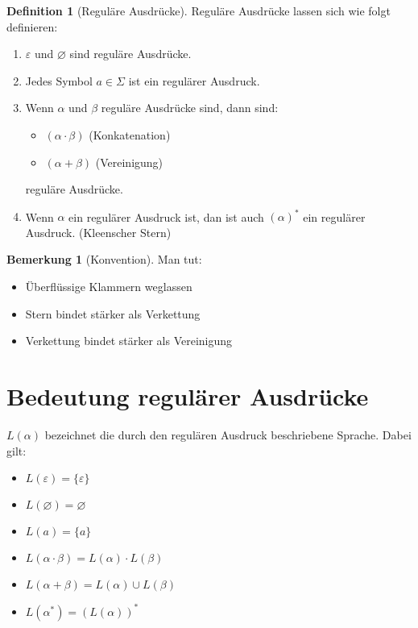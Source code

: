 \documentclass[11pt]{article} %
\theoremstyle{definition}
\newtheorem{definition}{Definition}
\newtheorem*{bemerkung}{Bemerkung}
\begin{document}
\begin{definition}[Reguläre Ausdrücke]
Reguläre Ausdrücke lassen sich wie folgt definieren:
\begin{enumerate}
\item $\varepsilon$ und $\varnothing$ sind reguläre Ausdrücke.
\item Jedes Symbol $a \in \Sigma$ ist ein regulärer Ausdruck.
\item Wenn $\alpha$ und $\beta$ reguläre Ausdrücke sind, dann sind:
\begin{itemize}
\item $(\alpha\cdot\beta)$ (Konkatenation)
\item $(\alpha+\beta)$ (Vereinigung)
\end{itemize}
reguläre Ausdrücke.
\item Wenn $\alpha$ ein regulärer Ausdruck ist, dan ist auch $(\alpha)^*$ ein regulärer Ausdruck. (Kleenscher Stern)
\end{enumerate}

\end{definition}

\begin{bemerkung}[Konvention] Man tut:
\begin{itemize}
\item Überflüssige Klammern weglassen
\item Stern bindet stärker als Verkettung
\item Verkettung bindet stärker als Vereinigung
\end{itemize}
\end{bemerkung}

\section{Bedeutung regulärer Ausdrücke}

$L(\alpha)$ bezeichnet die durch den regulären Ausdruck beschriebene Sprache. Dabei gilt: \begin{itemize}
\item $L(\varepsilon) = \{\varepsilon\}$
\item $L(\varnothing) = \varnothing$
\item $L(a) = \{a \}$
\item $L(\alpha\cdot\beta) = L(\alpha)\cdot L(\beta)$
\item $L(\alpha + \beta) = L(\alpha) \cup L(\beta)$
\item $L(\alpha^*) = (L(\alpha))^*$
\end{itemize}
\end{document}
